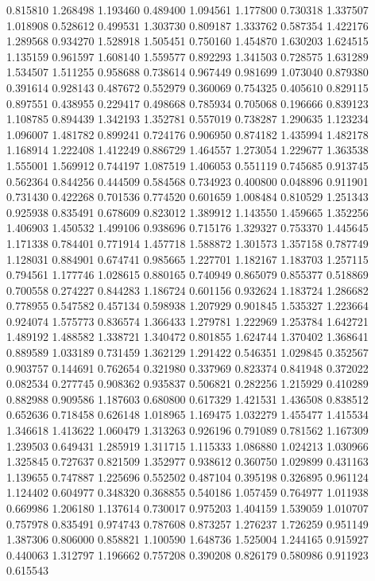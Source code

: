 0.815810
1.268498
1.193460
0.489400
1.094561
1.177800
0.730318
1.337507
1.018908
0.528612
0.499531
1.303730
0.809187
1.333762
0.587354
1.422176
1.289568
0.934270
1.528918
1.505451
0.750160
1.454870
1.630203
1.624515
1.135159
0.961597
1.608140
1.559577
0.892293
1.341503
0.728575
1.631289
1.534507
1.511255
0.958688
0.738614
0.967449
0.981699
1.073040
0.879380
0.391614
0.928143
0.487672
0.552979
0.360069
0.754325
0.405610
0.829115
0.897551
0.438955
0.229417
0.498668
0.785934
0.705068
0.196666
0.839123
1.108785
0.894439
1.342193
1.352781
0.557019
0.738287
1.290635
1.123234
1.096007
1.481782
0.899241
0.724176
0.906950
0.874182
1.435994
1.482178
1.168914
1.222408
1.412249
0.886729
1.464557
1.273054
1.229677
1.363538
1.555001
1.569912
0.744197
1.087519
1.406053
0.551119
0.745685
0.913745
0.562364
0.844256
0.444509
0.584568
0.734923
0.400800
0.048896
0.911901
0.731430
0.422268
0.701536
0.774520
0.601659
1.008484
0.810529
1.251343
0.925938
0.835491
0.678609
0.823012
1.389912
1.143550
1.459665
1.352256
1.406903
1.450532
1.499106
0.938696
0.715176
1.329327
0.753370
1.445645
1.171338
0.784401
0.771914
1.457718
1.588872
1.301573
1.357158
0.787749
1.128031
0.884901
0.674741
0.985665
1.227701
1.182167
1.183703
1.257115
0.794561
1.177746
1.028615
0.880165
0.740949
0.865079
0.855377
0.518869
0.700558
0.274227
0.844283
1.186724
0.601156
0.932624
1.183724
1.286682
0.778955
0.547582
0.457134
0.598938
1.207929
0.901845
1.535327
1.223664
0.924074
1.575773
0.836574
1.366433
1.279781
1.222969
1.253784
1.642721
1.489192
1.488582
1.338721
1.340472
0.801855
1.624744
1.370402
1.368641
0.889589
1.033189
0.731459
1.362129
1.291422
0.546351
1.029845
0.352567
0.903757
0.144691
0.762654
0.321980
0.337969
0.823374
0.841948
0.372022
0.082534
0.277745
0.908362
0.935837
0.506821
0.282256
1.215929
0.410289
0.882988
0.909586
1.187603
0.680800
0.617329
1.421531
1.436508
0.838512
0.652636
0.718458
0.626148
1.018965
1.169475
1.032279
1.455477
1.415534
1.346618
1.413622
1.060479
1.313263
0.926196
0.791089
0.781562
1.167309
1.239503
0.649431
1.285919
1.311715
1.115333
1.086880
1.024213
1.030966
1.325845
0.727637
0.821509
1.352977
0.938612
0.360750
1.029899
0.431163
1.139655
0.747887
1.225696
0.552502
0.487104
0.395198
0.326895
0.961124
1.124402
0.604977
0.348320
0.368855
0.540186
1.057459
0.764977
1.011938
0.669986
1.206180
1.137614
0.730017
0.975203
1.404159
1.539059
1.010707
0.757978
0.835491
0.974743
0.787608
0.873257
1.276237
1.726259
0.951149
1.387306
0.806000
0.858821
1.100590
1.648736
1.525004
1.244165
0.915927
0.440063
1.312797
1.196662
0.757208
0.390208
0.826179
0.580986
0.911923
0.615543
